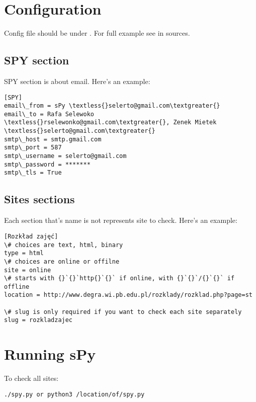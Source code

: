 \documentclass[letterpaper,10pt,english]{sphinxmanual}
\begin{document}
\section{Configuration}
\label{index:configuration}
Config file should be under . For full example see  in sources.


\subsection{SPY section}
\label{index:spy-section}
SPY section is about email. Here's an example:

\begin{Verbatim}[commandchars=\\\{\}]
[SPY]
email\_from = sPy \textless{}selerto@gmail.com\textgreater{}
email\_to = Rafa Selewoko \textless{}rselewonko@gmail.com\textgreater{}, Zenek Mietek \textless{}selerto@gmail.com\textgreater{}
smtp\_host = smtp.gmail.com
smtp\_port = 587
smtp\_username = selerto@gmail.com
smtp\_password = *******
smtp\_tls = True
\end{Verbatim}


\subsection{Sites sections}
\label{index:sites-sections}
Each section that's name is not  represents site to check. Here's an example:

\begin{Verbatim}[commandchars=\\\{\}]
[Rozkład zajęć]
\# choices are text, html, binary
type = html
\# choices are online or offilne
site = online
\# starts with {}`{}`http{}`{}` if online, with {}`{}`/{}`{}` if offline
location = http://www.degra.wi.pb.edu.pl/rozklady/rozklad.php?page=st

\# slug is only required if you want to check each site separately
slug = rozkladzajec
\end{Verbatim}


\section{Running sPy}
\label{index:running-spy}
To check all sites:

\begin{Verbatim}[commandchars=\\\{\}]
./spy.py or python3 /location/of/spy.py
\end{Verbatim}
\end{document}
